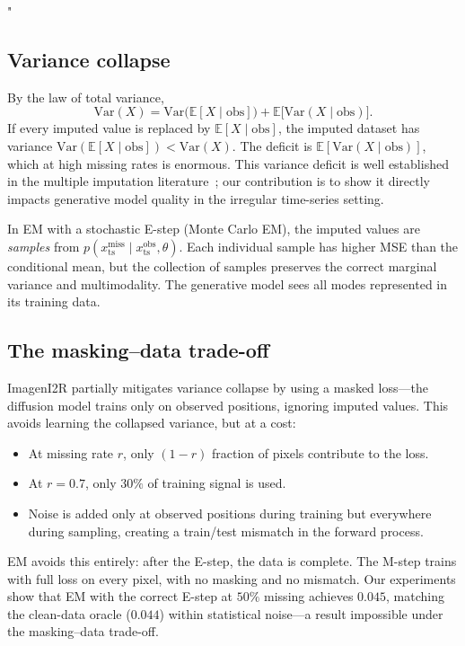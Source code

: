 "\documentclass{article}
\theoremstyle{plain}
\theoremstyle{definition}
\theoremstyle{remark}
\newcommand{\xts}{x_{\mathrm{ts}}}
\begin{document}
\subsection{Variance collapse}
\label{app:var-collapse}

By the law of total variance,
$$
\mathrm{Var}(X) = \mathrm{Var}\bigl(\mathbb{E}[X \mid \mathrm{obs}]\bigr) + \mathbb{E}\bigl[\mathrm{Var}(X \mid \mathrm{obs})\bigr].
$$
If every imputed value is replaced by $\mathbb{E}[X \mid \mathrm{obs}]$, the imputed dataset has variance $\mathrm{Var}(\mathbb{E}[X \mid \mathrm{obs}]) < \mathrm{Var}(X)$. The deficit is $\mathbb{E}[\mathrm{Var}(X \mid \mathrm{obs})]$, which at high missing rates is enormous. This variance deficit is well established in the multiple imputation literature~\citep{rubin1987multiple}; our contribution is to show it directly impacts generative model quality in the irregular time-series setting.

In EM with a stochastic E-step (Monte Carlo EM), the imputed values are \emph{samples} from $p(\xts^{\mathrm{miss}} \mid \xts^{\mathrm{obs}}, \theta)$. Each individual sample has higher MSE than the conditional mean, but the collection of samples preserves the correct marginal variance and multimodality. The generative model sees all modes represented in its training data.

\subsection{The masking--data trade-off}
\label{app:masking-tradeoff}

ImagenI2R partially mitigates variance collapse by using a masked loss---the diffusion model trains only on observed positions, ignoring imputed values. This avoids learning the collapsed variance, but at a cost:
\begin{itemize}
\setlength{\itemsep}{0pt}
\item At missing rate $r$, only $(1-r)$ fraction of pixels contribute to the loss.
\item At $r = 0.7$, only $30\%$ of training signal is used.
\item Noise is added only at observed positions during training but everywhere during sampling, creating a train/test mismatch in the forward process.
\end{itemize}
EM avoids this entirely: after the E-step, the data is complete. The M-step trains with full loss on every pixel, with no masking and no mismatch. Our experiments show that EM with the correct E-step at $50\%$ missing achieves $0.045$, matching the clean-data oracle ($0.044$) within statistical noise---a result impossible under the masking--data trade-off.
\end{document}
